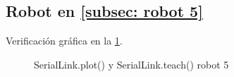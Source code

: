 \documentclass[a4paper,12pt]{article}
\begin{document}
\subsection{Robot en \cref{subsec: robot 5}}
Verificación gráfica en la \cref{teach robot 5}.

\begin{figure}[htpb]
    \centering
    \begin{adjustbox}{max width=\columnwidth}
    \end{adjustbox}
    \caption{SerialLink.plot() y SerialLink.teach() robot 5}
    \label{teach robot 5}
\end{figure}
\end{document}
